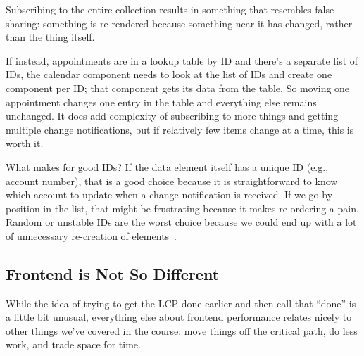 Subscribing to the entire collection results in something that resembles false-sharing: something is re-rendered because something near it has changed, rather than the thing itself. 

If instead, appointments are in a lookup table by ID and there's a separate list of IDs, the calendar component needs to look at the list of IDs and create one component per ID; that component gets its data from the table. So moving one appointment changes one entry in the table and everything else remains unchanged. It does add complexity of subscribing to more things and getting multiple change notifications, but if relatively few items change at a time, this is worth it.

What makes for good IDs? If the data element itself has a unique ID (e.g., account number), that is a good choice because it is straightforward to know which account to update when a change notification is received. If we go by position in the list, that might be frustrating because it makes re-ordering a pain. Random or unstable IDs are the worst choice because we could end up with a lot of unnecessary re-creation of elements~\cite{reactreconciliation}.

\subsection*{Frontend is Not So Different}
While the idea of trying to get the LCP done earlier and then call that ``done'' is a little bit unusual, everything else about frontend performance relates nicely to other things we've covered in the course: move things off the critical path, do less work, and trade space for time. 




